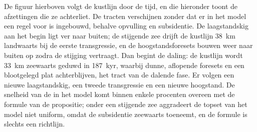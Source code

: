 De figuur hierboven volgt de kustlijn door de tijd, en die hieronder
toont de afzettingen die ze achterliet. De tracten verschijnen zonder dat er
in het model een regel voor is ingebouwd, behalve opvulling en subsidentie. De laagstandskig aan het begin ligt ver
naar buiten; de stijgende zee drijft de kustlijn \qty{38}{km} landwaarts bij de eerste
transgressie, en de hoogstandsforesets bouwen weer naar buiten op zodra de stijging vertraagt.
Dan begint de daling: de kustlijn wordt \qty{33}{km} zeewaarts geduwd in
\qty{187}{kyr}, waarbij dunne, aflopende foresets en een blootgelegd plat achterblijven,
het tract van de dalende fase. Er volgen een nieuwe laagstandskig, een tweede transgressie
en een nieuwe hoogstand. De snelheid van de  in het model
komt binnen enkele procenten overeen met de formule van de propositie; onder een
stijgende zee aggradeert de topset van het model niet uniform, omdat de subsidentie
zeewaarts toeneemt, en de formule is slechts een richtlijn.

